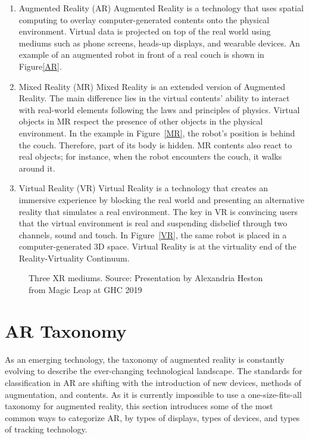 \begin{enumerate}
	\item Augmented Reality (AR)
	\newline
	Augmented Reality is a technology that uses spatial computing to overlay computer-generated contents onto the physical environment. Virtual data is projected on top of the real world using mediums such as phone screens, heads-up displays, and wearable devices. An example of an augmented robot in front of a real couch is shown in Figure\ref{AR}.
	\item Mixed Reality (MR)
	\newline
	Mixed Reality is an extended version of Augmented Reality. The main difference lies in the virtual contents' ability to interact with real-world elements following the laws and principles of physics. Virtual objects in MR respect the presence of other objects in the physical environment. In the example in Figure~\ref{MR}, the robot's position is behind the couch. Therefore, part of its body is hidden. MR contents also react to real objects; for instance, when the robot encounters the couch, it walks around it.
	\item Virtual Reality (VR)
	\newline
	Virtual Reality is a technology that creates an immersive experience by blocking the real world and presenting an alternative reality that simulates a real environment. The key in VR is convincing users that the virtual environment is real and suspending disbelief through two channels, sound and touch. In Figure~\ref{VR}, the same robot is placed in a computer-generated 3D space. Virtual Reality is at the virtuality end of the Reality-Virtuality Continuum.
\end{enumerate}
\begin{figure}[!ht]\centering
{}
\qquad
{}
\qquad
{}
\caption{Three XR mediums. Source: Presentation by Alexandria Heston from Magic Leap at GHC 2019}\label{fig3}
\end{figure}

\section{AR Taxonomy}
As an emerging technology, the taxonomy of augmented reality is constantly evolving to describe the ever-changing technological landscape. The standards for classification in AR are shifting with the introduction of new devices, methods of augmentation, and contents. As it is currently impossible to use a one-size-fits-all taxonomy for augmented reality, this section introduces some of the most common ways to categorize AR, by types of displays, types of devices, and types of tracking technology.

